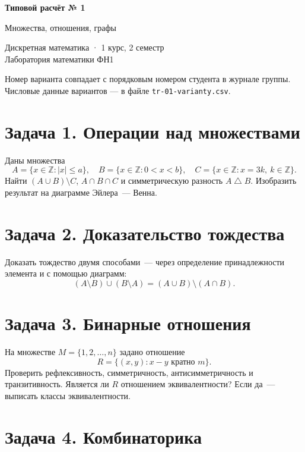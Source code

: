 \documentclass[12pt, a4paper]{article}
\begin{document}
\begin{center}
  {\large\bfseries Типовой расчёт № 1}

  \vspace{0.3em}
  {\large Множества, отношения, графы}

  \vspace{0.5em}
  {\small Дискретная математика · 1 курс, 2 семестр\\
  Лаборатория математики ФН1}
\end{center}

\vspace{1em}

\noindent
Номер варианта совпадает с порядковым номером студента в журнале группы.
Числовые данные вариантов — в файле \texttt{tr-01-varianty.csv}.

\section*{Задача 1. Операции над множествами}

Даны множества
\[
A = \{x \in \mathbb{Z} : |x| \le a\},\quad
B = \{x \in \mathbb{Z} : 0 < x < b\},\quad
C = \{x \in \mathbb{Z} : x = 3k,\ k \in \mathbb{Z}\}.
\]
Найти $(A \cup B) \setminus C$, $A \cap B \cap C$ и симметрическую разность
$A \bigtriangleup B$. Изобразить результат на диаграмме Эйлера~--- Венна.

\section*{Задача 2. Доказательство тождества}

Доказать тождество двумя способами~--- через определение принадлежности
элемента и с помощью диаграмм:
\[
(A \setminus B) \cup (B \setminus A) = (A \cup B) \setminus (A \cap B).
\]

\section*{Задача 3. Бинарные отношения}

На множестве $M = \{1, 2, \dots, n\}$ задано отношение
\[
R = \{(x, y) : x - y \text{ кратно } m\}.
\]
Проверить рефлексивность, симметричность, антисимметричность и транзитивность.
Является ли $R$ отношением эквивалентности? Если да~--- выписать классы
эквивалентности.

\section*{Задача 4. Комбинаторика}
\end{document}
